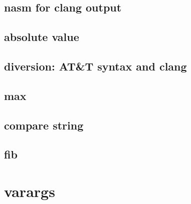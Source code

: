 \subsection{nasm for clang output}

\subsection{absolute value}

\subsection{diversion: AT\&T syntax and clang}

\subsection{max}

\subsection{compare string}

\subsection{fib}

\section{varargs}
